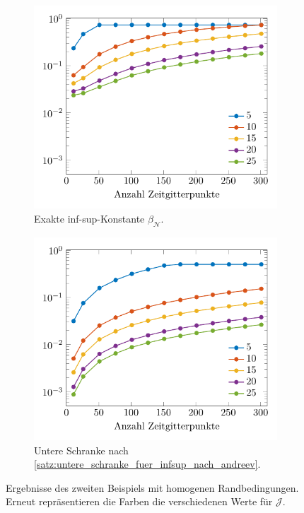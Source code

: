 \documentclass[../main.tex]{subfiles}
\begin{document}
\begin{figure}[tb]
    \centering
    \centering
    \begin{subfigure}[b]{0.495\textwidth}
        \centering
        \includegraphics[width=1\textwidth]{figures/chapter4/stability_fourier_dataset1_fig_1.pdf}
        \caption{Exakte inf-sup-Konstante $\beta_{\mathcal N}$.}
    \end{subfigure}
    \begin{subfigure}[b]{0.495\textwidth}
        \centering
        \includegraphics[width=1\textwidth]{figures/chapter4/stability_fourier_dataset1_fig_2.pdf}
        \caption{Untere Schranke nach \cref{satz:untere_schranke_fuer_infsup_nach_andreev}.}
    \end{subfigure}
    \caption[Stabilität der Diskretisierung mit homogenen Randbedingungen, zweites Beispiel.]{%
        Ergebnisse des zweiten Beispiels mit homogenen Randbedingungen.
        Erneut repräsentieren die Farben die verschiedenen Werte für $\mathcal J$.
        }
    \label{figure:infsup_periodisch_zwei_felder}
\end{figure}

\end{document}
